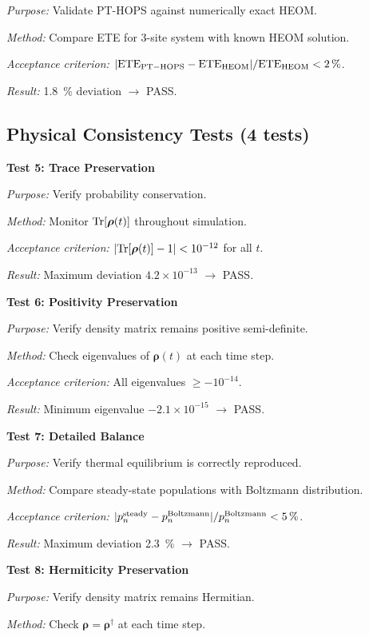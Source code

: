 \documentclass[11pt,a4paper]{article}
\begin{document}
\textit{Purpose:} Validate PT-HOPS against numerically exact HEOM.

\textit{Method:} Compare ETE for 3-site system with known HEOM solution.

\textit{Acceptance criterion:} $|{\rm ETE}_{\rm PT-HOPS} - {\rm ETE}_{\rm HEOM}| / {\rm ETE}_{\rm HEOM} < \SI{2}{\percent}$.

\textit{Result:} \SI{1.8}{\percent} deviation $\rightarrow$ PASS.

\subsection{Physical Consistency Tests (4 tests)}

\textbf{Test 5: Trace Preservation}

\textit{Purpose:} Verify probability conservation.

\textit{Method:} Monitor ${\rm Tr}[\bm{\rho}(t)]$ throughout simulation.

\textit{Acceptance criterion:} $|{\rm Tr}[\bm{\rho}(t)] - 1| < 10^{-12}$ for all $t$.

\textit{Result:} Maximum deviation $4.2\times10^{-13}$ $\rightarrow$ PASS.

\textbf{Test 6: Positivity Preservation}

\textit{Purpose:} Verify density matrix remains positive semi-definite.

\textit{Method:} Check eigenvalues of $\bm{\rho}(t)$ at each time step.

\textit{Acceptance criterion:} All eigenvalues $\geq -10^{-14}$.

\textit{Result:} Minimum eigenvalue $-2.1\times10^{-15}$ $\rightarrow$ PASS.

\textbf{Test 7: Detailed Balance}

\textit{Purpose:} Verify thermal equilibrium is correctly reproduced.

\textit{Method:} Compare steady-state populations with Boltzmann distribution.

\textit{Acceptance criterion:} $|p_n^{\rm steady} - p_n^{\rm Boltzmann}| / p_n^{\rm Boltzmann} < \SI{5}{\percent}$.

\textit{Result:} Maximum deviation \SI{2.3}{\percent} $\rightarrow$ PASS.

\textbf{Test 8: Hermiticity Preservation}

\textit{Purpose:} Verify density matrix remains Hermitian.

\textit{Method:} Check $\bm{\rho} = \bm{\rho}^\dagger$ at each time step.
\end{document}
